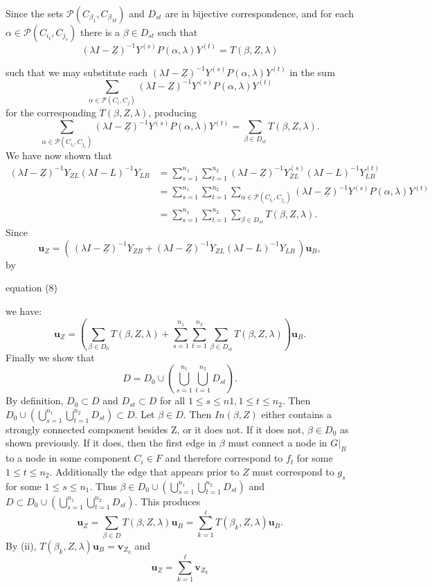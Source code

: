 \documentclass{paper}
\begin{document}
Since the sets $\mathcal{P}(C_{\beta_1},C_{\beta_M})$ and $D_{st}$ are in bijective correspondence, and for each $\alpha \in \mathcal{P}(C_{i_t},C_{j_s})$ there is a $\beta \in D_{st}$ such that
\[
(\lambda	I - \underline{Z})^{-1}Y^{(s)} P(\alpha,\lambda) Y^{(t)}
=
T(\beta,Z,\lambda)
\]


such that we may substitute each $(\lambda	I - \underline{Z})^{-1}Y^{(s)} P(\alpha,\lambda) Y^{(t)}$ in the sum
\[
\sum_{\alpha \in \mathcal{P}(C_i,C_j)} (\lambda	I - \underline{Z})^{-1}Y^{(s)}P(\alpha,\lambda) Y^{(t)}
\]
for the corresponding $T(\beta,Z,\lambda)$, producing
\[
\sum_{\alpha \in \mathcal{P}(C_{i_t},C_{j_s})}(\lambda	I - \underline{Z})^{-1} Y^{(s)}P(\alpha,\lambda) Y^{(t)} = \sum_{\beta \in D_{st}} T(\beta, Z, \lambda).
\]
We have now shown that 
\begin{align*}
(\lambda	I - \underline{Z})^{-1}Y_{ZL} (\lambda I - L)^{-1}Y_{LB} &= \sum_{s=1}^{n_1} \sum_{t=1}^{n_2} (\lambda	I - \underline{Z})^{-1}Y_{ZL}^{(s)} (\lambda I - L)^{-1}Y_{LB}^{(t)} \\
&= \sum_{s=1}^{n_1} \sum_{t=1}^{n_2} \sum_{\alpha \in \mathcal{P}(C_{i_t},C_{j_s})}(\lambda	I - \underline{Z})^{-1} Y^{(s)}P(\alpha,\lambda) Y^{(t)}\\
&= \sum_{s=1}^{n_1} \sum_{t=1}^{n_2} \sum_{\beta \in D_{st}} T(\beta, Z, \lambda).
\end{align*}
Since
\[
\mathbf{u}_{Z} = \left(\,(\lambda I - \underline{Z})^{-1}Y_{ZB} + (\lambda	I - \underline{Z})^{-1}Y_{ZL} (\lambda I - L)^{-1}Y_{LB} \,\right)\mathbf{u}_B,
\]
by \begin{bf}equation (8)\end{bf} we have:
\[
\mathbf{u}_{Z} 
=
\left(
\sum_{\beta \in D_0} T(\beta,Z,\lambda)
+
\sum_{s=1}^{n_1} \sum_{t=1}^{n_2} \sum_{\beta \in D_{st}} T(\beta, Z, \lambda) \right) \mathbf{u}_B.
\]
Finally we show that
\[
D = D_0 \cup \left( \bigcup_{s=1}^{n_1} \bigcup_{t=1}^{n_2} D_{st} \right).
\]
By definition, $D_0 \subset D$ and $D_{st} \subset D$ for all $1 \leq s \leq n1 ,1 \leq t \leq n_2$. Then $D_0 \cup \left( \bigcup_{s=1}^{n_1} \bigcup_{t=1}^{n_2} D_{st} \right) \subset D$. Let $\beta \in D$. Then $In(\beta,Z)$ either contains a strongly connected component besides Z, or it does not. If it does not, $\beta \in D_0$ as shown previously. If it does, then the first edge in $\beta$ must connect a node in $G|_B$ to a node in some component $C_i \in F$ and therefore correspond to $f_t$ for some $1 \leq t \leq n_2$. Additionally the edge that appears prior to $Z$ must correspond to $g_s$ for some $1 \leq s \leq n_1$. Thus $\beta \in D_0 \cup \left( \bigcup_{s=1}^{n_1} \bigcup_{t=1}^{n_2} D_{st} \right)$ and $D \subset D_0 \cup \left( \bigcup_{s=1}^{n_1} \bigcup_{t=1}^{n_2} D_{st} \right)$. This produces
\[
\mathbf{u}_{Z} 
=
\sum_{\beta \in D} T(\beta,Z,\lambda) \mathbf{u}_B
=\sum_{k=1}^{\ell} T(\beta_k,Z,\lambda) \mathbf{u}_B.
\]
By (ii), $T(\beta_k,Z,\lambda) \mathbf{u}_B = \mathbf{v}_{Z_k}$ and
\[
\mathbf{u}_{Z} 
=
\sum_{k=1}^{\ell} \mathbf{v}_{Z_k}
\]
\end{document}
